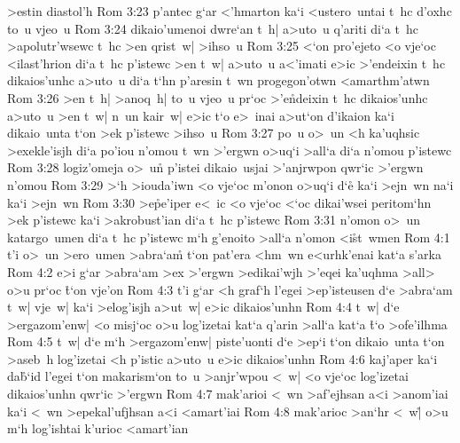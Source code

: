 >estin
diastol'h\bibvsend
\vs Rom 3:23
p'antec
g`ar
<'hmarton
ka`i
<ustero~untai
t~hc
d'oxhc
to~u
vjeo~u\bibvsend
\vs Rom 3:24
dikaio'umenoi
dwre`an
t~h|
a>uto~u
q'ariti
di`a
t~hc
>apolutr'wsewc
t~hc
>en
qrist~w|
>ihso~u\bibvsend
\vs Rom 3:25
<`on
pro'ejeto
<o
vje`oc
<ilast'hrion
di`a
t~hc
p'istewc
>en
t~w|
a>uto~u
a<'imati
e>ic
>'endeixin
t~hc
dikaios'unhc
a>uto~u
di`a
t`hn
p'aresin
t~wn
progegon'otwn
<amarthm'atwn\bibvsend
\vs Rom 3:26
>en
t~h|
>anoq~h|
to~u
vjeo~u
pr`oc
>'e\r{n}deixin
t~hc
dikaios'unhc
a>uto~u
>en
t~w|
n~un
kair~w|
e>ic
t`o
e>~inai
a>ut`on
d'ikaion
ka`i
dikaio~unta
t`on
>ek
p'istewc
>ihso~u\bibvsend
\vs Rom 3:27
po~u
o>~un
<h
ka'uqhsic
>exekle'isjh
di`a
po'iou
n'omou
t~wn
>'ergwn
o>uq`i
>all`a
di`a
n'omou
p'istewc\bibvsend
\vs Rom 3:28
logiz'omeja
o>~un\r{}
p'istei
dikaio~usjai
>'anjrwpon
qwr`ic
>'ergwn
n'omou\bibvsend
\vs Rom 3:29
>`h
>iouda'iwn
<o
vje`oc
m'onon
o>uq`i
d`e\r{}
ka`i
>ejn~wn
na`i
ka`i
>ejn~wn\bibvsend
\vs Rom 3:30
>e\r{p}e'iper
e<~ic
<o
vje`oc
<`oc
dikai'wsei
peritom`hn
>ek
p'istewc
ka`i
>akrobust'ian
di`a
t~hc
p'istewc\bibvsend
\vs Rom 3:31
n'omon
o>~un
katargo~umen
di`a
t~hc
p'istewc
m`h
g'enoito
>all`a
n'omon
<i\r{s}t~wmen\bibvsend
{}
\vs Rom 4:1
t'i
o>~un
>ero~umen
>abra`am\r{}
t`on
pat'era
<hm~wn
e<urhk'enai
kat`a
s'ar\-ka\bibvsend
\vs Rom 4:2
e>i
g`ar
>abra`am
>ex
>'ergwn
>edikai'wjh
>'eqei
ka'uqhma
>all>
o>u
pr`oc
\r{t}`on
vje'on\bibvsend
\vs Rom 4:3
t'i
g`ar
<h
graf`h
l'egei
>ep'isteusen
d`e
>abra`am
t~w|
vje~w|
ka`i
>elog'isjh
a>ut~w|
e>ic
dikaios'unhn\bibvsend
\vs Rom 4:4
t~w|
d`e
>ergazom'enw|
<o
misj`oc
o>u
log'izetai
kat`a
q'arin
>all`a
kat`a
\r{t}`o
>ofe'ilhma\bibvsend
\vs Rom 4:5
t~w|
d`e
m`h
>ergazom'enw|
piste'uonti
d`e
>ep`i
t`on
dikaio~unta
t`on
>aseb~h
log'izetai
<h
p'istic
a>uto~u
e>ic
dikaios'unhn\bibvsend
\vs Rom 4:6
kaj'aper
ka`i
da\r{b}`id
l'egei
t`on
makarism`on
to~u
>anjr'wpou
<~w|
<o
vje`oc
log'izetai
dikaios'unhn
qwr`ic
>'ergwn\bibvsend
\vs Rom 4:7
mak'arioi
<~wn
>af'ejhsan
a<i
>anom'iai
ka`i
<~wn
>epekal'ufjhsan
a<i
<amart'iai\bibvsend
\vs Rom 4:8
mak'arioc
>an`hr
<~w|\r{}
o>u
m`h
log'ishtai
k'urioc
<amart'ian\bibvsend
